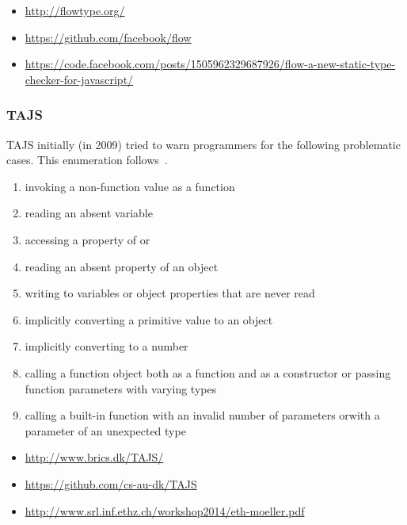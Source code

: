 
\begin{itemize}
\item \url{http://flowtype.org/}
\item \url{https://github.com/facebook/flow}
\item \url{https://code.facebook.com/posts/1505962329687926/flow-a-new-static-type-checker-for-javascript/}
\end{itemize}


\subsubsection{TAJS}

TAJS initially (in 2009) tried to warn programmers for the following problematic cases. This enumeration follows~\cite{jensen_type_2009}.

\begin{enumerate}
  \item invoking a non-function value as a function
  \item reading an absent variable
  \item accessing a property of  or 
  \item reading an absent property of an object
  \item writing to variables or object properties that are never read
  \item implicitly converting a primitive value to an object
  \item implicitly converting  to a number
  \item calling a function object both as a function and as a constructor or passing function parameters with varying types
  \item calling a built-in function with an invalid number of parameters orwith a parameter of an unexpected type
\end{enumerate}

\begin{itemize}
 \item \url{http://www.brics.dk/TAJS/}
 \item \url{https://github.com/cs-au-dk/TAJS}
 \item \url{http://www.srl.inf.ethz.ch/workshop2014/eth-moeller.pdf}
\end{itemize}



